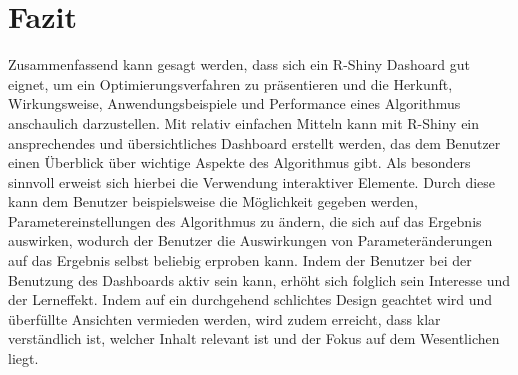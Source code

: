 \section{Fazit}\label{chap:Fazit}
Zusammenfassend kann gesagt werden, dass sich ein R-Shiny Dashoard gut eignet, um ein Optimierungsverfahren zu präsentieren und die Herkunft, Wirkungsweise, Anwendungsbeispiele und Performance eines Algorithmus anschaulich darzustellen. Mit relativ einfachen Mitteln kann mit R-Shiny ein ansprechendes und übersichtliches Dashboard erstellt werden, das dem Benutzer einen Überblick über wichtige Aspekte des Algorithmus gibt.\newline
Als besonders sinnvoll erweist sich hierbei die Verwendung interaktiver Elemente. \newline
Durch diese kann dem Benutzer beispielsweise die Möglichkeit gegeben werden, Parametereinstellungen des Algorithmus zu ändern, die sich auf das Ergebnis auswirken, wodurch der Benutzer die Auswirkungen von Parameteränderungen auf das Ergebnis selbst beliebig erproben kann. 
Indem der Benutzer bei der Benutzung des Dashboards aktiv sein kann, erhöht sich folglich sein Interesse und der Lerneffekt.  
Indem auf ein durchgehend schlichtes Design geachtet wird und überfüllte Ansichten vermieden werden, wird zudem erreicht, dass klar verständlich ist, welcher Inhalt relevant ist und der Fokus auf dem Wesentlichen liegt.


